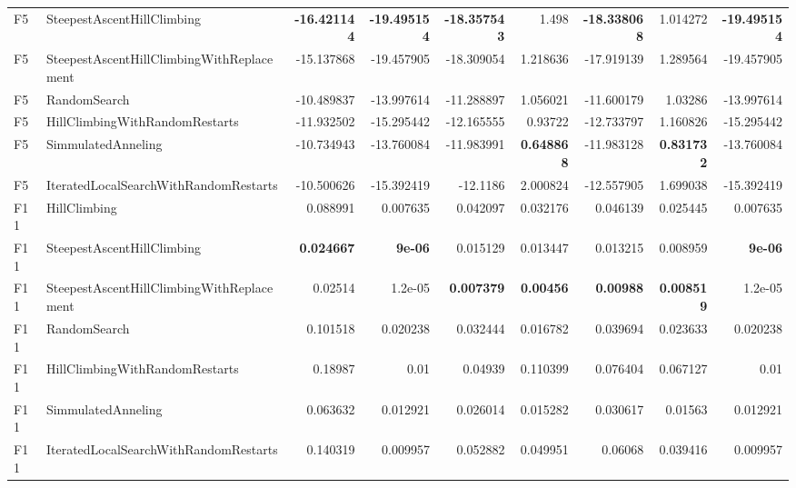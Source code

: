 \begin{tabular}{llrrrrrrr}
F5 & SteepestAscentHillClimbing & \textbf{-16.421144} & \textbf{-19.495154} & \textbf{-18.357543} & 1.498 & \textbf{-18.338068} & 1.014272 & \textbf{-19.495154} \\ 
F5 & SteepestAscentHillClimbingWithReplacement & -15.137868 & -19.457905 & -18.309054 & 1.218636 & -17.919139 & 1.289564 & -19.457905 \\ 
F5 & RandomSearch & -10.489837 & -13.997614 & -11.288897 & 1.056021 & -11.600179 & 1.03286 & -13.997614 \\ 
F5 & HillClimbingWithRandomRestarts & -11.932502 & -15.295442 & -12.165555 & 0.93722 & -12.733797 & 1.160826 & -15.295442 \\ 
F5 & SimmulatedAnneling & -10.734943 & -13.760084 & -11.983991 & \textbf{0.648868} & -11.983128 & \textbf{0.831732} & -13.760084 \\ 
F5 & IteratedLocalSearchWithRandomRestarts & -10.500626 & -15.392419 & -12.1186 & 2.000824 & -12.557905 & 1.699038 & -15.392419 \\ 
F11 & HillClimbing & 0.088991 & 0.007635 & 0.042097 & 0.032176 & 0.046139 & 0.025445 & 0.007635 \\ 
F11 & SteepestAscentHillClimbing & \textbf{0.024667} & \textbf{9e-06} & 0.015129 & 0.013447 & 0.013215 & 0.008959 & \textbf{9e-06} \\ 
F11 & SteepestAscentHillClimbingWithReplacement & 0.02514 & 1.2e-05 & \textbf{0.007379} & \textbf{0.00456} & \textbf{0.00988} & \textbf{0.008519} & 1.2e-05 \\ 
F11 & RandomSearch & 0.101518 & 0.020238 & 0.032444 & 0.016782 & 0.039694 & 0.023633 & 0.020238 \\ 
F11 & HillClimbingWithRandomRestarts & 0.18987 & 0.01 & 0.04939 & 0.110399 & 0.076404 & 0.067127 & 0.01 \\ 
F11 & SimmulatedAnneling & 0.063632 & 0.012921 & 0.026014 & 0.015282 & 0.030617 & 0.01563 & 0.012921 \\ 
F11 & IteratedLocalSearchWithRandomRestarts & 0.140319 & 0.009957 & 0.052882 & 0.049951 & 0.06068 & 0.039416 & 0.009957 \\ 
\bottomrule
\end{tabular}
